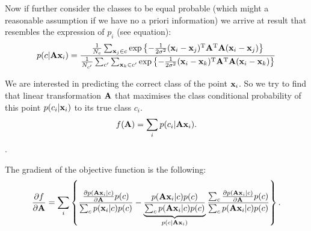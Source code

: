 Now if further consider the classes to be equal probable (which might a reasonable assumption if we have no a priori information) we arrive at result that resembles the expression of $p_i$ (see equation):
\begin{align}
	p(c|\mathbf{A}\mathbf{x}_i) = \frac{
				\frac{1}{N_c}\sum_{\mathbf{x}_j \in c}\exp\left\{-\frac{1}{2\sigma^2}(\mathbf{x}_i - \mathbf{x}_j)^\mathrm{T}\mathbf{A}^\mathrm{T}\mathbf{A}(\mathbf{x}_i - \mathbf{x}_j)\right\}
				}
				{
				\frac{1}{N_{c'}}\sum_{c'} \sum_{\mathbf{x}_k \in c'}\exp\left\{-\frac{1}{2\sigma^2}(\mathbf{x}_i - \mathbf{x}_k)^\mathrm{T}\mathbf{A}^\mathrm{T}\mathbf{A}(\mathbf{x}_i - \mathbf{x}_k)\right\} 
				}
\end{align}

We are interested in predicting the correct class of the point $\mathbf{x}_i$. So we try to find that linear transformation $\mathbf{A}$ that maximises the class conditional probability of this point $p(c_i|\mathbf{x}_i)$ to its true class $c_i$. 
\begin{align}
	f(\mathbf{A}) = \sum_i p(c_i|\mathbf{A}\mathbf{x}_i).
\end{align}.

The gradient of the objective function is the following:
\begin{align}
	\frac{\partial f}{\partial \mathbf{A}} = 
	  \sum_i \left\{ 
	  			\frac
	  			{
	  				\frac{\partial p(\mathbf{A}\mathbf{x}_i|c)}{\partial \mathbf{A}}p(c)
	  			}
	  			{
	  				\sum_c p(\mathbf{x}_i|c)p(c)
	  			}
	  			- \underbrace{\frac{
	  				p(\mathbf{A}\mathbf{x}_i|c)p(c)
	  			}{
	  				\sum_c p(\mathbf{A}\mathbf{x}_i|c)p(c)		
	  			}}_{p(c|\mathbf{A}\mathbf{x}_i)}
	  			\frac{
	  				\sum_c \frac{\partial p(\mathbf{A}\mathbf{x}_i|c)}{\partial \mathbf{A}}p(c)
	  			}{
	  				\sum_c p(\mathbf{A}\mathbf{x}_i|c)p(c)
	  			}
	  	     \right \}.
\end{align}